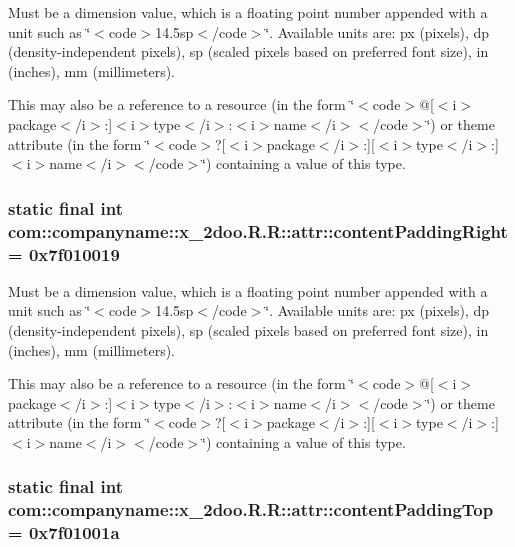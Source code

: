 Must be a dimension value, which is a floating point number appended with a unit such as \char`\"{}$<$code$>$14.5sp$<$/code$>$\char`\"{}. Available units are: px (pixels), dp (density-independent pixels), sp (scaled pixels based on preferred font size), in (inches), mm (millimeters). 

This may also be a reference to a resource (in the form \char`\"{}$<$code$>$@\mbox{[}$<$i$>$package$<$/i$>$:\mbox{]}$<$i$>$type$<$/i$>$:$<$i$>$name$<$/i$>$$<$/code$>$\char`\"{}) or theme attribute (in the form \char`\"{}$<$code$>$?\mbox{[}$<$i$>$package$<$/i$>$:\mbox{]}\mbox{[}$<$i$>$type$<$/i$>$:\mbox{]}$<$i$>$name$<$/i$>$$<$/code$>$\char`\"{}) containing a value of this type. \hypertarget{classcom_1_1companyname_1_1x__2doo_1_1_r_1_1attr_04875a7b7657e8dc4e1862c272181a24}{
\subsubsection[{contentPaddingRight}]{\setlength{\rightskip}{0pt plus 5cm}static final int com::companyname::x\_\-2doo.R.R::attr::contentPaddingRight = 0x7f010019}}
\label{classcom_1_1companyname_1_1x__2doo_1_1_r_1_1attr_04875a7b7657e8dc4e1862c272181a24}


Must be a dimension value, which is a floating point number appended with a unit such as \char`\"{}$<$code$>$14.5sp$<$/code$>$\char`\"{}. Available units are: px (pixels), dp (density-independent pixels), sp (scaled pixels based on preferred font size), in (inches), mm (millimeters). 

This may also be a reference to a resource (in the form \char`\"{}$<$code$>$@\mbox{[}$<$i$>$package$<$/i$>$:\mbox{]}$<$i$>$type$<$/i$>$:$<$i$>$name$<$/i$>$$<$/code$>$\char`\"{}) or theme attribute (in the form \char`\"{}$<$code$>$?\mbox{[}$<$i$>$package$<$/i$>$:\mbox{]}\mbox{[}$<$i$>$type$<$/i$>$:\mbox{]}$<$i$>$name$<$/i$>$$<$/code$>$\char`\"{}) containing a value of this type. \hypertarget{classcom_1_1companyname_1_1x__2doo_1_1_r_1_1attr_ebd5134a2d8798a2bf3b90593acb918d}{
\subsubsection[{contentPaddingTop}]{\setlength{\rightskip}{0pt plus 5cm}static final int com::companyname::x\_\-2doo.R.R::attr::contentPaddingTop = 0x7f01001a}}
\label{classcom_1_1companyname_1_1x__2doo_1_1_r_1_1attr_ebd5134a2d8798a2bf3b90593acb918d}



